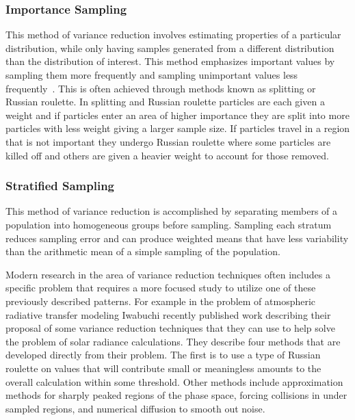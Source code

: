\subsubsection*{\textbf{Importance Sampling }} This method of variance reduction involves estimating properties of a particular distribution, while only having samples generated from a different distribution than the distribution of interest. This method emphasizes important values by sampling them more frequently and sampling unimportant values less frequently~\cite{wikipediaImportanceSampling}. This is often achieved through methods known as splitting or Russian roulette. In splitting and Russian roulette particles are each given a weight and if particles enter an area of higher importance they are split into more particles with less weight giving a larger sample size. If particles travel in a region that is not important they undergo Russian roulette where some particles are killed off and others are given a heavier weight to account for those removed.~\cite{melnik2000rare}

\subsubsection*{ \textbf{Stratified Sampling }} This method of variance reduction is accomplished by separating members of a population into homogeneous groups before sampling. Sampling each stratum reduces sampling error and can produce weighted means that have less variability than the arithmetic mean of a simple sampling of the population. ~\cite{wikipediaStratifiedSampling}

Modern research in the area of variance reduction techniques often includes a specific problem that requires a more focused study to utilize one of these previously described patterns.
%
For example in the problem of atmospheric radiative transfer modeling Iwabuchi recently published work describing their proposal of some variance reduction techniques that they can use to help solve the problem of solar radiance calculations.
%
They describe four methods that are developed directly from their problem.
%
The first is to use a type of Russian roulette on values that will contribute small or meaningless amounts to the overall calculation within some threshold.
%
Other methods include approximation methods for sharply peaked regions of the phase space, forcing collisions in under sampled regions, and numerical diffusion to smooth out noise.~\cite{iwabuchi2015efficient}
 